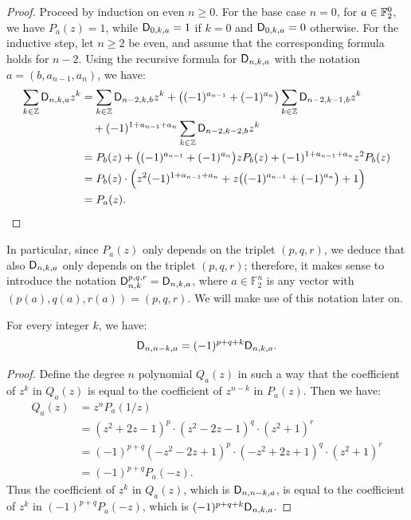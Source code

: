\documentclass[11pt]{llncs}
\begin{document}
\begin{proof}
	Proceed by induction on even $n\geq 0$. 
	For the base case $n=0$, for $a\in\mathbb{F}_2^0$, we have $P_a(z)=1$, while $\mathsf{D}_{0,k,a}=1$ if $k=0$ and $\mathsf{D}_{0,k,a}=0$ otherwise. 
	For the inductive step, let $n\geq 2$ be even, and assume that the corresponding formula holds for $n-2$. Using the recursive formula for $\mathsf{D}_{n,k,a}$ with the notation $a=(b,a_{n-1},a_n)$, we have:
	\begin{align*}
	\begin{split}
	\sum_{k\in\mathbb{Z}}\mathsf{D}_{n,k,a} z^k&=\sum_{k\in\mathbb{Z}}\mathsf{D}_{n-2,k,b}z^k+\big((-1)^{a_{n-1}}+(-1)^{a_{n}}\big)\sum_{k\in\mathbb{Z}}\mathsf{D}_{n-2,k-1,b}z^k\\
	&\quad+(-1)^{1+a_{n-1}+a_n}\sum_{k\in\mathbb{Z}}\mathsf{D}_{n-2,k-2,b}z^k\\
	&=P_b(z)+\big((-1)^{a_{n-1}}+(-1)^{a_{n}}\big)zP_b(z)+(-1)^{1+a_{n-1}+a_n}z^2P_b(z)\\
	&=P_b(z)\cdot\Big(z^2(-1)^{1+a_{n-1}+a_n}+z\big((-1)^{a_{n-1}}+(-1)^{a_{n}}\big)+1\Big)\\
	&=P_a(z).\qedhere
	\end{split}
	\end{align*}
\end{proof}

\begin{remark}
    In particular, since $P_a(z)$ only depends on the triplet $(p,q,r)$, we deduce that also $\mathsf{D}_{n,k,a}$ only depends on the triplet $(p,q,r)$; therefore, it makes sense to introduce the notation $\mathsf D_{n,k}^{p,q,r}=\mathsf{D}_{n,k,a}$, where $a\in\mathbb F_2^n$ is any vector with $(p(a),q(a),r(a))=(p,q,r)$. We will make use of this notation later on.
\end{remark}

\begin{Prop}\label{prop:symmetry}
	For every integer $k$, we have:
	\[
	\mathsf{D}_{n,n-k,a}=(-1)^{p+q+k}\mathsf{D}_{n,k,a}.
	\]
\end{Prop}

\begin{proof}
	Define the degree $n$ polynomial $Q_a(z)$ in such a way that the coefficient of $z^k$ in $Q_a(z)$ is equal to the coefficient of $z^{n-k}$ in $P_a(z)$. Then we have:
	\begin{align*}
	Q_a(z)&=z^nP_a(1/z)\\
	&=(z^2+2z-1)^p\cdot(z^2-2z-1)^q\cdot(z^2+1)^r\\
	&=(-1)^{p+q}(-z^2-2z+1)^p\cdot(-z^2+2z+1)^q\cdot(z^2+1)^r\\
	&=(-1)^{p+q}P_a(-z).
	\end{align*}
	Thus the coefficient of $z^k$ in $Q_a(z)$, which is $\mathsf{D}_{n,n-k,a}$, is equal to the coefficient of $z^k$ in $(-1)^{p+q}P_a(-z)$, which is $(-1)^{p+q+k}\mathsf{D}_{n,k,a}$.
\end{proof}
\end{document}
